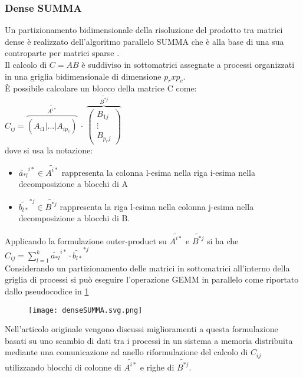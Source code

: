 \subsubsection{Dense SUMMA} %
Un partizionamento bidimensionale della risoluzione del prodotto tra matrici
dense è realizzato dell'algoritmo parallelo SUMMA \parencite{denseSumma} che è alla
base di una sua controparte per matrici sparse \parencite{sparseSUMMA}.\\
Il calcolo di $C=AB$ è suddiviso in sottomatrici assegnate a processi organizzati 
in una griglia bidimensionale di dimensione  $p_r x p_c$.\\
È possibile calcolare un blocco della matrice C come:
$C_{ij} =  \overbrace{\left(  A_{i1} | \dots |  A_{ip_c} \right)}^{\tilde{A^{i*}} }
~\cdot~ \overbrace{\left( 
        \begin{array}{c} B_{1j} \\ \vdots \\  B_{p_r j}
        \end{array} \right)} ^{\tilde{B^{*j}}} $\\
dove si usa la notazione:
\begin{itemize}
  \item $\tilde{a_{*l}}^{i*} \in \tilde{ A^{i*}}$ rappresenta 
    la colonna l-esima nella riga i-esima nella decomposizione a blocchi di A
  \item $\tilde{b_{l*}}^{*j} \in  \tilde{B^{*j}}$ rappresenta 
    la riga l-esima nella colonna j-esima nella decomposizione a blocchi di B.
\end{itemize}  
Applicando la formulazione outer-product su $\tilde{ A^{i*}}$ e $\tilde{B^{*j}}$
si ha che $C_{ij}=\sum\limits_{l=1}^{k}\tilde{a_{*l}}^{i*} \cdot \tilde{b_{l*}}^{*j}$\\
Considerando un partizionamento delle matrici in sottomatrici all'interno della
griglia di processi %
si può eseguire l'operazione GEMM in parallelo come riportato dallo pseudocodice
in \ref{figCode:denseSUMMA}\\
\begin{figure}[h]
  \centering \texttt{[image: denseSUMMA.svg.png]}
  \caption[esecuzione dense SUMMA sul processo $P_{ij}$] \decoRule \label{figCode:denseSUMMA}
\end{figure}
Nell'articolo originale vengono discussi miglioramenti a questa formulazione
basati su uno scambio di dati tra i processi in un sistema a memoria distribuita
mediante una comunicazione ad anello 
riformulazione del calcolo di $C_{ij}$ utilizzando blocchi di
colonne di $\tilde{ A^{i*}}$ e righe di $\tilde{B^{*j}}$.\\

